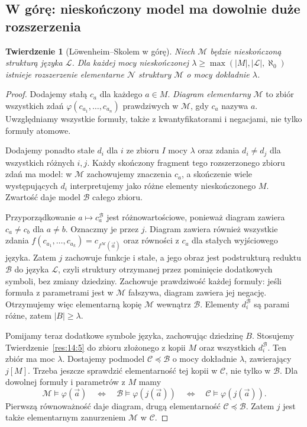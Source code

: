 \documentclass[11pt,a4paper]{article}
\numberwithin{equation}{section}
\theoremstyle{plain}
\newtheorem{twierdzenie}{Twierdzenie}[section]
\theoremstyle{definition}
\theoremstyle{remark}
\begin{document}
\subsection*{W górę: nieskończony model ma dowolnie duże rozszerzenia}\label{sec:14:4}
\begin{twierdzenie}[Löwenheim--Skolem w górę]\label{res:14:9}
Niech $\mathcal M$ będzie nieskończoną strukturą języka $\mathcal L$. Dla każdej mocy nieskończonej $\lambda\ge\max(|M|,|\mathcal L|,\aleph_0)$ istnieje rozszerzenie elementarne $\mathcal N$ struktury $\mathcal M$ o mocy dokładnie $\lambda$.
\end{twierdzenie}
\begin{proof}
Dodajemy stałą $c_a$ dla każdego $a\in M$. \emph{Diagram elementarny} $\mathcal M$ to zbiór wszystkich zdań $\varphi(c_{a_1},\ldots,c_{a_n})$ prawdziwych w $\mathcal M$, gdy $c_a$ nazywa $a$. Uwzględniamy wszystkie formuły, także z kwantyfikatorami i negacjami, nie tylko formuły atomowe.

Dodajemy ponadto stałe $d_i$ dla $i$ ze zbioru $I$ mocy $\lambda$ oraz zdania $d_i\ne d_j$ dla wszystkich różnych $i,j$. Każdy skończony fragment tego rozszerzonego zbioru zdań ma model: w $\mathcal M$ zachowujemy znaczenia $c_a$, a skończenie wiele występujących $d_i$ interpretujemy jako różne elementy nieskończonego $M$. Zwartość daje model $\mathcal B$ całego zbioru.

Przyporządkowanie $a\mapsto c_a^{\mathcal B}$ jest różnowartościowe, ponieważ diagram zawiera $c_a\ne c_b$ dla $a\ne b$. Oznaczmy je przez $j$. Diagram zawiera również wszystkie zdania $f(c_{a_1},\ldots,c_{a_k})=c_{f^{\mathcal M}(\vec a)}$ oraz równości z $c_{a}$ dla stałych wyjściowego języka. Zatem $j$ zachowuje funkcje i stałe, a jego obraz jest podstrukturą reduktu $\mathcal B$ do języka $\mathcal L$, czyli struktury otrzymanej przez pominięcie dodatkowych symboli, bez zmiany dziedziny. Zachowuje prawdziwość każdej formuły: jeśli formuła z parametrami jest w $\mathcal M$ fałszywa, diagram zawiera jej negację. Otrzymujemy więc elementarną kopię $\mathcal M$ wewnątrz $\mathcal B$. Elementy $d_i^{\mathcal B}$ są parami różne, zatem $|B|\ge\lambda$.

Pomijamy teraz dodatkowe symbole języka, zachowując dziedzinę $B$. Stosujemy Twierdzenie~\ref{res:14:5} do zbioru złożonego z kopii $M$ oraz wszystkich $d_i^{\mathcal B}$. Ten zbiór ma moc $\lambda$. Dostajemy podmodel $\mathcal C\preccurlyeq\mathcal B$ o mocy dokładnie $\lambda$, zawierający $j[M]$. Trzeba jeszcze sprawdzić elementarność tej kopii w $\mathcal C$, nie tylko w $\mathcal B$. Dla dowolnej formuły i parametrów z $M$ mamy
\[
\mathcal M\models\varphi(\vec a)\quad\Longleftrightarrow\quad
\mathcal B\models\varphi(j(\vec a))\quad\Longleftrightarrow\quad
\mathcal C\models\varphi(j(\vec a)).
\]
Pierwszą równoważność daje diagram, drugą elementarność $\mathcal C\preccurlyeq\mathcal B$. Zatem $j$ jest także elementarnym zanurzeniem $\mathcal M$ w $\mathcal C$.


\end{proof}
\end{document}
